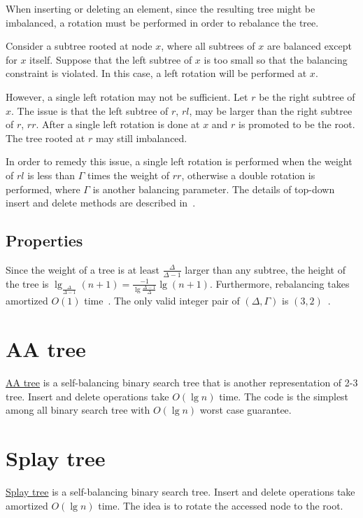 When inserting or deleting an element, since the resulting tree might be imbalanced, a rotation must be performed in order to rebalance the tree. 

Consider a subtree rooted at node $x$, where all subtrees of $x$ are balanced except for $x$ itself. Suppose that the left subtree of $x$ is too small so that the balancing constraint is violated. In this case, a left rotation will be performed at $x$. 

However, a single left rotation may not be sufficient. Let $r$ be the right subtree of $x$. The issue is that the left subtree of $r$, $rl$, may be larger than the right subtree of $r$, $rr$. After a single left rotation is done at $x$ and $r$ is promoted to be the root. The tree rooted at $r$ may still imbalanced.

In order to remedy this issue, a single left rotation is performed when the weight of $rl$ is less than $\Gamma$ times the weight of $rr$, otherwise a double rotation is performed, where $\Gamma$ is another balancing parameter. The details of top-down insert and delete methods are described in~\cite{Lai1993}.

\subsection{Properties}
Since the weight of a tree is at least $\frac{\Delta}{\Delta - 1}$ larger than any subtree, the height of the tree is $\lg_{\frac{\Delta}{\Delta - 1}} (n + 1) = \frac{-1}{\lg \frac{\Delta - 1}{\Delta}} \lg (n + 1)$.
Furthermore, rebalancing takes amortized $O(1)$ time~\cite{Blum1980}.
The only valid integer pair of $(\Delta, \Gamma)$ is $(3, 2)$~\cite{Hirai2011}.

\section{AA tree}
\href{https://en.wikipedia.org/wiki/AA_tree}{AA tree} is a self-balancing binary search tree that is another representation of 2-3 tree. Insert and delete operations take $O(\lg n)$ time. The code is the simplest among all binary search tree with $O(\lg n)$ worst case guarantee.

\section{Splay tree}
\href{https://en.wikipedia.org/wiki/Splay_tree}{Splay tree} is a self-balancing binary search tree. Insert and delete operations take amortized $O(\lg n)$ time. The idea is to rotate the accessed node to the root.


